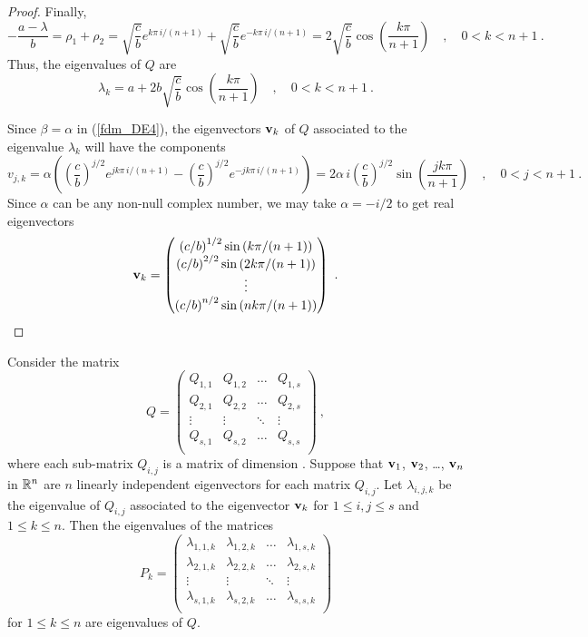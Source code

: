 \begin{proof}
Finally,
\[
- \frac{a-\lambda}{b} = \rho_1+\rho_2 = 
\sqrt{\frac{c}{b}} e^{k\pi\,i/(n+1)} + 
\sqrt{\frac{c}{b}} e^{-k\pi\,i/(n+1)} =
2 \sqrt{\frac{c}{b}} \cos\left(\frac{k\pi}{n+1}\right)
\quad , \quad 0 < k < n+1 \ .
\]
Thus, the eigenvalues of $Q$ are
\[
\lambda_k = a + 2 b \sqrt{\frac{c}{b}} \cos\left(\frac{k\pi}{n+1}\right)
\quad , \quad 0 < k < n+1 \ .
\]

Since $\beta = \alpha$ in (\ref{fdm_DE4}), the eigenvectors
$\mathbf{v}_k$ of $Q$ associated to the eigenvalue $\lambda_k$ will have
the components
\[
v_{j,k} = \alpha \left(\left(\frac{c}{b}\right)^{j/2} e^{jk\pi\,i/(n+1)}
- \left(\frac{c}{b}\right)^{j/2} e^{-jk\pi\,i/(n+1)}\right)
= 2 \alpha \,i \left(\frac{c}{b}\right)^{j/2}
\sin\left(\frac{jk\pi}{n+1}\right) \quad, \quad
0 < j < n+1 \ .
\]
Since $\alpha$ can be any non-null complex number, we may
take $\alpha =-i/2$ to get real eigenvectors
\[
\mathbf{v}_k =
\begin{pmatrix}
\left(c/b\right)^{1/2} \sin\left(k\pi/(n+1)\right) \\
\left(c/b\right)^{2/2} \sin\left(2k\pi/(n+1)\right) \\
\vdots \\
\left(c/b\right)^{n/2} \sin\left(nk\pi/(n+1)\right)
\end{pmatrix} \ .  \qedhere
\]
\end{proof}

\begin{prop}\label{fdm_eig_RR}
Consider the matrix
\[
Q =
\begin{pmatrix}
Q_{1,1} & Q_{1,2} & \ldots & Q_{1,s} \\
Q_{2,1} & Q_{2,2} & \ldots & Q_{2,s} \\
\vdots & \vdots & \ddots & \vdots \\
Q_{s,1} & Q_{s,2} & \ldots & Q_{s,s} \\
\end{pmatrix} \ ,
\]
where each sub-matrix $Q_{i,j}$ is a matrix of dimension \nn.
Suppose that $\mathbf{v}_1$, $\mathbf{v}_2$, \ldots, $\mathbf{v}_n$ in $\mathbb{R}^n$
are $n$ linearly independent eigenvectors for each matrix $Q_{i,j}$.
Let $\displaystyle \lambda_{i,j,k}$ be the eigenvalue of $Q_{i,j}$
associated to the eigenvector $\mathbf{v}_k$ for $1\leq i, j \leq s$ and
$1\leq k \leq n$.  Then the eigenvalues of the  matrices
\[
P_k =
\begin{pmatrix}
\lambda_{1,1,k} & \lambda_{1,2,k} & \ldots & \lambda_{1,s,k} \\
\lambda_{2,1,k} & \lambda_{2,2,k} & \ldots & \lambda_{2,s,k} \\
\vdots & \vdots & \ddots & \vdots \\
\lambda_{s,1,k} & \lambda_{s,2,k} & \ldots & \lambda_{s,s,k} \\
\end{pmatrix}
\]
for $1 \leq k \leq n$ are eigenvalues of $Q$.
\end{prop}

